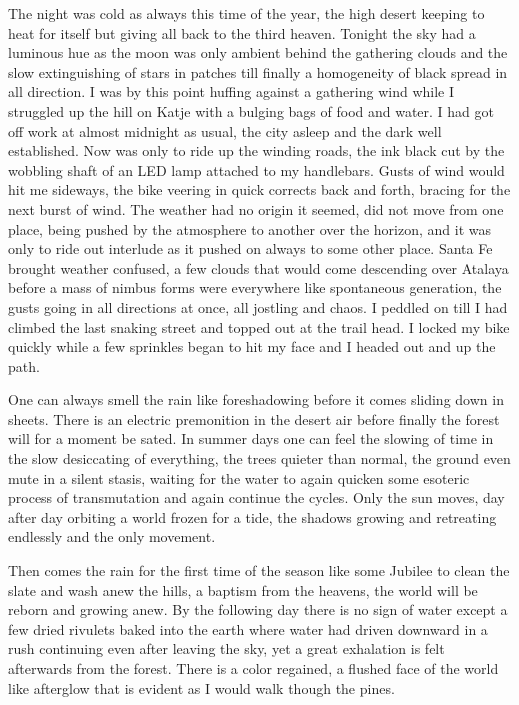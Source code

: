 \documentclass[ebook, 10pt, openright, onecolumn]{memoir}
\begin{document}
The night was cold as always this time of the year, the high desert keeping to
heat for itself but giving all back to the third heaven.  Tonight the sky had a
luminous hue as the moon was only ambient behind the gathering clouds and the
slow extinguishing of stars in patches till finally a homogeneity of black
spread in all direction.  I was by this point huffing against a gathering wind
while I struggled up the hill on Katje with a bulging bags of food and water.  I
had got off work at almost midnight as usual, the city asleep and the dark well
established.  Now was only to ride up the winding roads, the ink black cut by
the wobbling shaft of an LED lamp attached to my handlebars.  Gusts of wind
would hit me sideways, the bike veering in quick corrects back and forth,
bracing for the next burst of wind.  The weather had no origin it seemed, did
not move from one place, being pushed by the atmosphere to another over the
horizon, and it was only to ride out interlude as it pushed on always to some
other place.  Santa Fe brought weather confused, a few clouds that would come
descending over Atalaya before a mass of nimbus forms were everywhere like
spontaneous generation, the gusts going in all directions at once, all jostling
and chaos.  I peddled on till I had climbed the last snaking street and topped
out at the trail head.  I locked my bike quickly while a few sprinkles began to
hit my face and I headed out and up the path.

One can always smell the rain like foreshadowing before it comes sliding down in
sheets.  There is an electric premonition in the desert air before finally the
forest will for a moment be sated.  In summer days one can feel the slowing of
time in the slow desiccating of everything, the trees quieter than normal, the
ground even mute in a silent stasis, waiting for the water to again quicken some
esoteric process of transmutation and again continue the cycles.  Only the sun
moves, day after day orbiting a world frozen for a tide, the shadows growing and
retreating endlessly and the only movement.

Then comes the rain for the first time of the season like some Jubilee to clean
the slate and wash anew the hills, a baptism from the heavens, the world will be
reborn and growing anew.  By the following day there is no sign of water except
a few dried rivulets baked into the earth where water had driven downward in a
rush continuing even after leaving the sky, yet a great exhalation is felt
afterwards from the forest.  There is a color regained, a flushed face of the
world like afterglow that is evident as I would walk though the pines.
\end{document}
